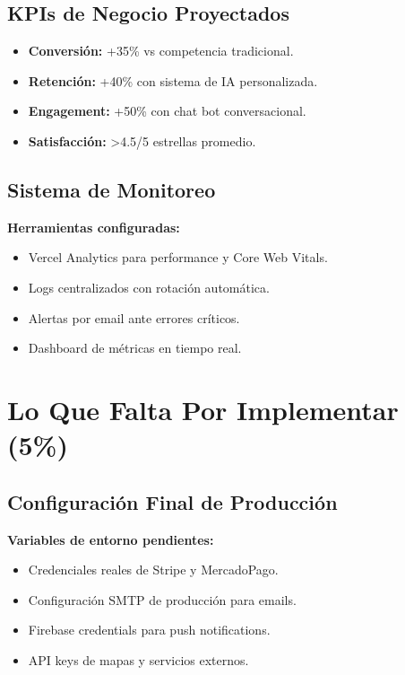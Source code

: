\documentclass[a4paper,12pt]{article}
\begin{document}
\subsection{KPIs de Negocio Proyectados}
\begin{itemize}
  \item \textbf{Conversión:} +35\% vs competencia tradicional.
  \item \textbf{Retención:} +40\% con sistema de IA personalizada.
  \item \textbf{Engagement:} +50\% con chat bot conversacional.
  \item \textbf{Satisfacción:} >4.5/5 estrellas promedio.
\end{itemize}

\subsection{Sistema de Monitoreo}
\textbf{Herramientas configuradas:}
\begin{itemize}
  \item Vercel Analytics para performance y Core Web Vitals.
  \item Logs centralizados con rotación automática.
  \item Alertas por email ante errores críticos.
  \item Dashboard de métricas en tiempo real.
\end{itemize}

\section{Lo Que Falta Por Implementar (5\%)}

\subsection{Configuración Final de Producción}
\textbf{Variables de entorno pendientes:}
\begin{itemize}
  \item Credenciales reales de Stripe y MercadoPago.
  \item Configuración SMTP de producción para emails.
  \item Firebase credentials para push notifications.
  \item API keys de mapas y servicios externos.
\end{itemize}
\end{document}
